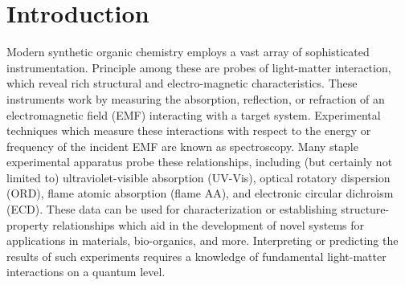 \chapter{Introduction} \label{ch:int}

Modern synthetic organic chemistry employs a vast array of sophisticated instrumentation.
Principle among these are probes of light-matter interaction, which reveal rich structural and 
electro-magnetic characteristics. These instruments work by measuring the absorption, 
reflection, or refraction of an electromagnetic field (EMF) interacting with a target system. 
Experimental techniques which measure these interactions with respect to the energy or frequency
of the incident EMF are known as spectroscopy. Many staple experimental apparatus probe these
relationships, including (but certainly not limited to)
ultraviolet-visible absorption (UV-Vis), 
optical rotatory dispersion (ORD), 
flame atomic absorption (flame AA),
and electronic circular dichroism (ECD).
These data can be used for characterization or establishing structure-property relationships 
which aid in the development of novel systems for applications in materials, bio-organics, 
and more. 
Interpreting or predicting the results of such experiments requires a knowledge of fundamental 
light-matter interactions on a quantum level.  

